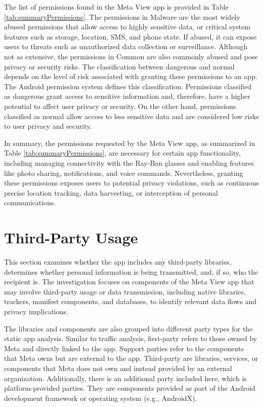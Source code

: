 The list of permissions found in the Meta View app is provided in Table \ref{tab:summaryPermissions}. The permissions in Malware are the most widely abused permissions that allow access to highly sensitive data, or critical system features such as storage, location, SMS, and phone state. If abused, it can expose users to threats such as unauthorized data collection or surveillance. Although not as extensive, the permissions in Common are also commonly abused and pose privacy or security risks. The classification between dangerous and normal depends on the level of risk associated with granting these permissions to an app. The Android permission system defines this classification. Permissions classified as dangerous grant access to sensitive information and, therefore, have a higher potential to affect user privacy or security. On the other hand, permissions classified as normal allow access to less sensitive data and are considered low risks to user privacy and security.

In summary, the permissions requested by the Meta View app, as summarized in Table \ref{tab:summaryPermissions}, are necessary for certain app functionality, including managing connectivity with the Ray-Ban glasses and enabling features like photo sharing, notifications, and voice commands. Nevertheless, granting these permissions exposes users to potential privacy violations, such as continuous precise location tracking, data harvesting, or interception of personal communications. 

\section{Third-Party Usage}
This section examines whether the app includes any third-party libraries, determines whether personal information is being transmitted, and, if so, who the recipient is. The investigation focuses on components of the Meta View app that may involve third-party usage or data transmission, including native libraries, trackers, manifest components, and databases, to identify relevant data flows and privacy implications. 

The libraries and components are also grouped into different party types for the static app analysis. Similar to traffic analysis, first-party refers to those owned by Meta and directly linked to the app. Support parties refer to the components that Meta owns but are external to the app. Third-party are libraries, services, or components that Meta does not own and instead provided by an external organization. Additionally, there is an additional party included here, which is platform-provided parties. They are components provided as part of the Android development framework or operating system (e.g., AndroidX).


